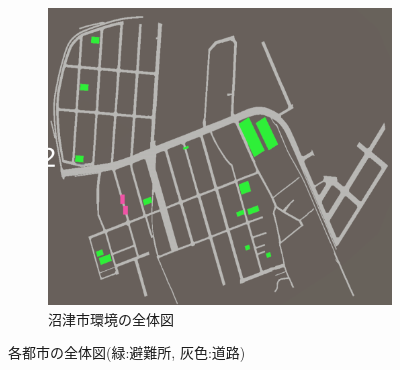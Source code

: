 \begin{figure}[H]
\begin{subfigure}{0.45\textwidth}
      \includegraphics[width=\textwidth]{Figures/Numazu-Map.png}
      \caption{沼津市環境の全体図}
      \label{fig:NumazuMap}
  \end{subfigure}
  \caption{各都市の全体図(緑:避難所, 灰色:道路)}
  \label{fig:Maps}
\end{figure}
